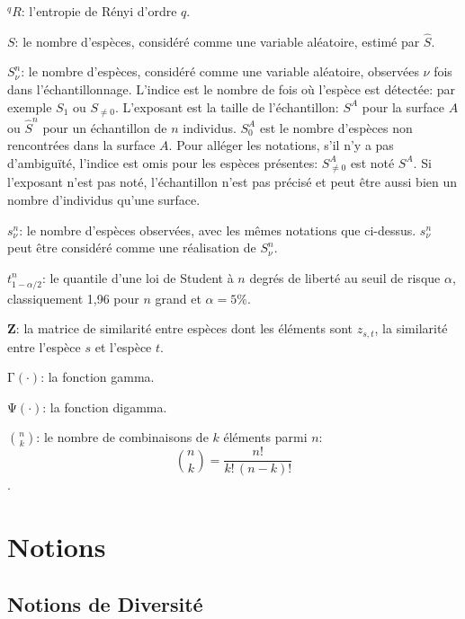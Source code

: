 \documentclass[
  11pt,
  french,
  a4paper,
  extrafontsizes,onecolumn,openright
  ]{memoir}
\newlength{\rf}
\begin{document}
\noindent \(^{q}\!R\): l'entropie de Rényi d'ordre \(q\).

\noindent \(S\): le nombre d'espèces, considéré comme une variable aléatoire, estimé par \(\hat{S}\).

\noindent \(S^{n}_{\nu}\): le nombre d'espèces, considéré comme une variable aléatoire, observées \(\nu\) fois dans l'échantillonnage.
L'indice est le nombre de fois où l'espèce est détectée: par exemple \(S_{1}\) ou \(S_{\ne 0}\).
L'exposant est la taille de l'échantillon: \(S^{A}\) pour la surface \(A\) ou \(\hat{S}^{n}\) pour un échantillon de \(n\) individus.
\(S^{A}_{0}\) est le nombre d'espèces non rencontrées dans la surface \(A\).
Pour alléger les notations, s'il n'y a pas d'ambiguïté, l'indice est omis pour les espèces présentes: \(S^{A}_{\ne 0}\) est noté \(S^{A}\).
Si l'exposant n'est pas noté, l'échantillon n'est pas précisé et peut être aussi bien un nombre d'individus qu'une surface.

\noindent \(s^{n}_{\nu}\): le nombre d'espèces observées, avec les mêmes notations que ci-dessus.
\(s^{n}_{\nu}\) peut être considéré comme une réalisation de \(S^{n}_{\nu}\).

\noindent \(t^{n}_{1-\alpha/2}\): le quantile d'une loi de Student à \(n\) degrés de liberté au seuil de risque \(\alpha\), classiquement 1,96 pour \(n\) grand et \(\alpha=5\%\).

\noindent \(\mathbf{Z}\): la matrice de similarité entre espèces dont les éléments sont \(z_{s,t}\), la similarité entre l'espèce \(s\) et l'espèce \(t\).

\noindent \(\mathrm{\Gamma}(\cdot)\): la fonction gamma.

\noindent \(\mathrm{\Psi}(\cdot)\): la fonction digamma.

\noindent \(\binom{n}{k}\): le nombre de combinaisons de \(k\) éléments parmi \(n\): \[\binom{n}{k}=\frac{n!}{k!\,(n-k)!}\].

\mainmatter

\hypertarget{part-notions}{%
\part{Notions}\label{part-notions}}

\hypertarget{notions-de-diversituxe9}{%
\chapter{Notions de Diversité}\label{notions-de-diversituxe9}}
\end{document}

